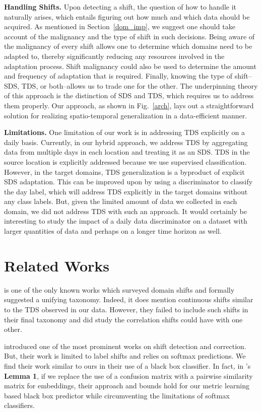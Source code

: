 \documentclass{article}
\begin{document}
\textbf{Handling Shifts.} Upon detecting a shift, the question of how to handle it naturally arises, which entails figuring out how much and which data should be acquired. As mentioned in Section~\ref{dom_imp}, we suggest one should take account of the malignancy and the type of shift in such decisions. Being aware of the malignancy of every shift allows one to determine which domains need to be adapted to, thereby significantly reducing any resources involved in the adaptation process. Shift malignancy could also be used to determine the amount and frequency of adaptation that is required. Finally, knowing the type of shift-- SDS, TDS, or both--allows us to trade one for the other. The underpinning theory of this approach is the distinction of SDS and TDS, which requires us to address them properly. Our approach, as shown in Fig.~\ref{arch}, lays out a straightforward solution for realizing spatio-temporal generalization in a data-efficient manner.

\textbf{Limitations.} One limitation of our work is in addressing TDS explicitly on a daily basis. Currently, in our hybrid approach, we address TDS by aggregating data from multiple days in each location and treating it as an SDS. TDS in the source location is explicitly addressed because we use supervised classification. However, in the target domains, TDS generalization is a byproduct of explicit SDS adaptation. This can be improved upon by using a discriminator to classify the day label, which will address TDS explicitly in the target domains without any class labels.  But, given the limited amount of data we collected in each domain, we did not address TDS with such an approach. It would certainly be interesting to study the impact of a daily data discriminator on a dataset with larger quantities of data and perhaps on a longer time horizon as well. 

\section{Related Works}

\cite{moreno2012unifying} is one of the only known works which surveyed domain shifts and formally suggested a unifying taxonomy. Indeed, it does mention continuous shifts similar to the TDS observed in our data. However, they failed to include such shifts in their final taxonomy and did study the correlation shifts could have with one other.

\cite{lipton2018detecting} introduced one of the most prominent works on shift detection and correction. But, their work is limited to label shifts and relies on softmax predictions. We find their work similar to ours in their use of a black box classifier. In fact, in \cite{lipton2018detecting}'s \textbf{Lemma 1}, if we replace the use of a confusion matrix with a pairwise similarity matrix for embeddings, their approach and bounds hold for our metric learning based black box predictor while circumventing the limitations of softmax classifiers.  
\end{document}

